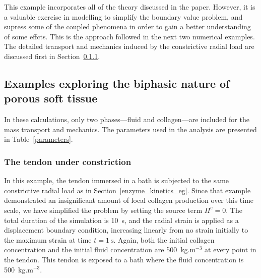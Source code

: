 This example incorporates all of the theory discussed in the
paper. However, it is a valuable exercise in
modelling to simplify the boundary value problem, and supress some of
the coupled phenomena in order to gain a better understanding of some
effcts. This is the approach followed in the next two numerical
examples. The detailed transport and mechanics induced by the
constrictive radial load are discussed first in Section~\ref{pinching}. 

\subsection{Examples exploring the biphasic nature of porous soft tissue}
\label{firstorder}

In these calculations, only two phases---fluid and collagen---are
included for the mass transport and mechanics. The parameters used in the analysis
are presented in Table~\ref{parameters}. 


\subsubsection{The tendon under constriction}
\label{pinching}


In this example, the tendon immersed in a bath is subjected to the same
constrictive radial load as in Section~\ref{enzyme_kinetics_eg}. Since
that example demonstrated an insignificant amount of local collagen production
over this time scale, we have simplified the
problem by setting the source term $\Pi^\mathrm{c} = 0$. The total
duration of the simulation is 
10~s, and the radial strain is applied as a displacement boundary
condition, increasing linearly from no strain initially to the maximum
strain at time $t = 1~\mathrm{s}$. Again,
both the initial collagen 
concentration and the initial fluid concentration are 500~kg.m$^{-3}$
at every point in the tendon. This tendon is exposed to a bath where
the fluid concentration is 500~kg.m$^{-3}$.


